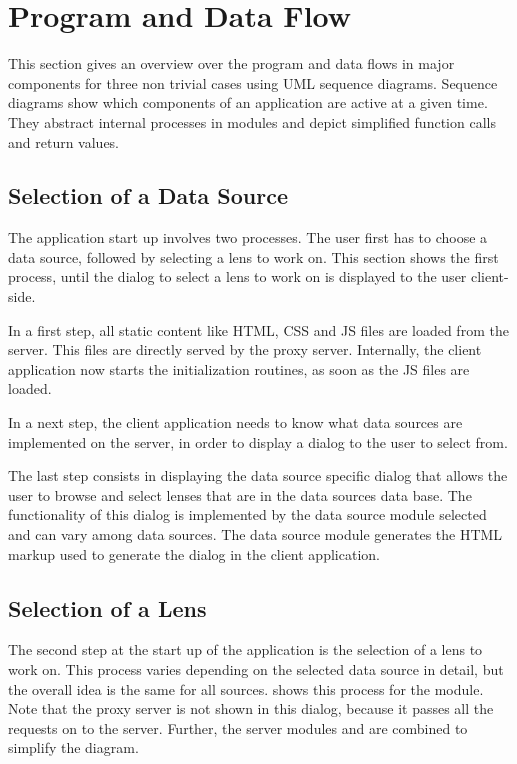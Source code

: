 \section{Program and Data Flow}
\label{sec:pd_flow}

This section gives an overview over the program and data flows in major components for three non trivial cases using UML sequence diagrams.
Sequence diagrams show which components of an application are active at a given time.
They abstract internal processes in modules and depict simplified function calls and return values.



\subsection{Selection of a Data Source}

The application start up involves two processes.
The user first has to choose a data source, followed by selecting a lens to work on.
This section shows the first process, until the dialog to select a lens to work on is displayed to the user client-side.

In a first step, all static content like HTML, CSS and JS files are loaded from the server.
This files are directly served by the proxy server.
Internally, the client application now starts the initialization routines, as soon as the JS files are loaded.

In a next step, the client application needs to know what data sources are implemented on the server, in order to display a dialog to the user to select from.

The last step consists in displaying the data source specific dialog that allows the user to browse and select lenses that are in the data sources data base.
The functionality of this dialog is implemented by the data source module selected and can vary among data sources.
The data source module generates the HTML markup used to generate the dialog in the client application.



\subsection{Selection of a Lens}

The second step at the start up of the application is the selection of a lens to work on.
This process varies depending on the selected data source in detail, but the overall idea is the same for all sources.
 shows this process for the \sw module.
Note that the proxy server is not shown in this dialog, because it passes all the requests on to the server.
Further, the server modules  and  are combined to simplify the diagram.

